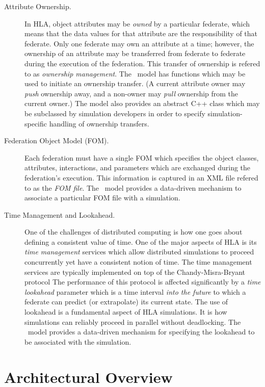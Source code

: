 \begin{description}
\item[Attribute Ownership.]
In HLA, object attributes may be {\em owned} by a particular federate, 
which means that the data values for that attribute are the responsibility
of that federate.
Only one federate may own an attribute at a time; however, the ownership of an
attribute may be transferred from federate to federate during the execution of
the federation.
This transfer of ownership is refered to as {\em ownership management}.
The \TrickHLA\ model has functions which may be used to initiate an ownership
transfer.
(A current attribute owner may {\em push} ownership away,
and a non-owner may {\em pull} ownership from the current owner.)
The model also provides an abstract C++ class which may be subclassed by simulation
developers in order to specify simulation-specific handling of ownership transfers.

\item[Federation Object Model (FOM).]
Each federation must have a single FOM which specifies the object classes, 
attributes, interactions, and parameters which are exchanged during the
federation's execution.
This information is captured in an XML file refered to as the {\em FOM file}.
The \TrickHLA\ model provides a data-driven mechanism to associate a particular
FOM file with a simulation.

\item[Time Management and Lookahead.]
One of the challenges of distributed computing is how one goes about defining
a consistent value of time.  
One of the major aspects of HLA is its {\em time management} services which
allow distributed simulations to proceed concurrently yet have a consistent notion
of time.  
The time management services are typically implemented on top of the
Chandy-Misra-Bryant protocol\cite{art:chandy-misra}
The performance of this protocol is affected significantly by a 
{\em time lookahead} parameter\cite{art:fujimoto-acm}
which is a time interval {\em into the future} to which a federate can predict
(or extrapolate) its current state.
The use of lookahead is a fundamental aspect of HLA simulations.
It is how simulations can reliably proceed in parallel without deadlocking.
The \TrickHLA\ model provides a data-driven mechanism for specifying the lookahead
to be associated with the simulation.

\end{description}

\section{Architectural Overview}

